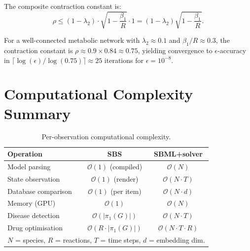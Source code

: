 \documentclass[11pt,twocolumn,a4paper]{article}
\newcommand{\BigO}{\mathcal{O}}
\begin{document}
The composite contraction constant is:
\begin{equation}
  \rho \leq (1 - \lambda_2) \cdot
  \sqrt{1 - \frac{\beta_1}{R}} \cdot 1
  = (1 - \lambda_2)\sqrt{1 - \frac{\beta_1}{R}}.
  \label{eq:contraction-constant}
\end{equation}

For a well-connected metabolic network with $\lambda_2 \approx 0.1$
and $\beta_1/R \approx 0.3$, the contraction constant is
$\rho \approx 0.9 \times 0.84 \approx 0.75$, yielding convergence to
$\epsilon$-accuracy in $\lceil \log(\epsilon) / \log(0.75) \rceil
\approx 25$ iterations for $\epsilon = 10^{-8}$.


\section{Computational Complexity Summary}
\label{app:complexity}

\begin{table}[H]
\centering
\caption{Per-observation computational complexity.}
\label{tab:complexity}
\small
\begin{tabular}{@{}lcc@{}}
\toprule
\textbf{Operation} & \textbf{SBS} & \textbf{SBML+solver} \\
\midrule
Model parsing          & $\BigO(1)$ (compiled) & $\BigO(N)$ \\
State observation      & $\BigO(1)$ (render)   & $\BigO(N \cdot T)$ \\
Database comparison    & $\BigO(1)$ (per item) & $\BigO(N \cdot d)$ \\
Memory (GPU)           & $\BigO(1)$            & $\BigO(N)$ \\
Disease detection      & $\BigO(|\pi_1(G)|)$   & $\BigO(N \cdot T)$ \\
Drug optimisation      & $\BigO(R \cdot |\pi_1(G)|)$ & $\BigO(N \cdot T \cdot R)$ \\
\bottomrule
\multicolumn{3}{l}{\footnotesize $N$ = species, $R$ = reactions,
$T$ = time steps, $d$ = embedding dim.}
\end{tabular}
\end{table}
\end{document}
